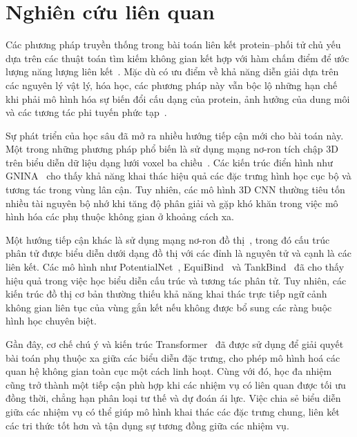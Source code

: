 \section{Nghiên cứu liên quan}
Các phương pháp truyền thống trong bài toán liên kết protein--phối tử chủ yếu dựa trên các thuật toán tìm kiếm không gian kết hợp với hàm chấm điểm để ước lượng năng lượng liên kết~\cite{dhillon2024molecular}. Mặc dù có ưu điểm về khả năng diễn giải dựa trên các nguyên lý vật lý, hóa học, các phương pháp này vẫn bộc lộ những hạn chế khi phải mô hình hóa sự biến đổi cấu dạng của protein, ảnh hưởng của dung môi và các tương tác phi tuyến phức tạp~\cite{li2024deep}.

Sự phát triển của học sâu đã mở ra nhiều hướng tiếp cận mới cho bài toán này. Một trong những phương pháp phổ biến là sử dụng mạng nơ-ron tích chập 3D~\cite{ragoza2017protein} trên biểu diễn dữ liệu dạng lưới voxel ba chiều~\cite{francoeur2020three, ragoza2017protein}. Các kiến trúc điển hình như GNINA~\cite{mcnutt2021gnina} cho thấy khả năng khai thác hiệu quả các đặc trưng hình học cục bộ và tương tác trong vùng lân cận. Tuy nhiên, các mô hình 3D CNN thường tiêu tốn nhiều tài nguyên bộ nhớ khi tăng độ phân giải và gặp khó khăn trong việc mô hình hóa các phụ thuộc không gian ở khoảng cách xa.

Một hướng tiếp cận khác là sử dụng mạng nơ-ron đồ thị~\cite{tang2025deep},
 trong đó cấu trúc phân tử được biểu diễn dưới dạng đồ thị với các đỉnh là nguyên tử và cạnh là các liên kết. Các mô hình như PotentialNet~\cite{feinberg2018potentialnet}, EquiBind~\cite{stark2022equibind} và TankBind~\cite{lu2022tankbind} đã cho thấy hiệu quả trong việc học biểu diễn cấu trúc và tương tác phân tử. Tuy nhiên, các kiến trúc đồ thị cơ bản thường thiếu khả năng khai thác trực tiếp ngữ cảnh không gian liên tục của vùng gắn kết nếu không được bổ sung các ràng buộc hình học chuyên biệt.

Gần đây, cơ chế chú ý và kiến trúc Transformer~\cite{vaswani2017attention} đã được sử dụng để giải quyết bài toán phụ thuộc xa giữa các biểu diễn đặc trưng, cho phép mô hình hoá các quan hệ không gian toàn cục một cách linh hoạt. Cùng với đó, học đa nhiệm~\cite{caruana1997multitask} cũng trở thành một tiếp cận phù hợp khi các nhiệm vụ có liên quan được tối ưu đồng thời, chẳng hạn phân loại tư thế và dự đoán ái lực. Việc chia sẻ biểu diễn giữa các nhiệm vụ có thể giúp mô hình khai thác các đặc trưng chung, liên kết các tri thức tốt hơn và tận dụng sự tương đồng giữa các nhiệm vụ.

